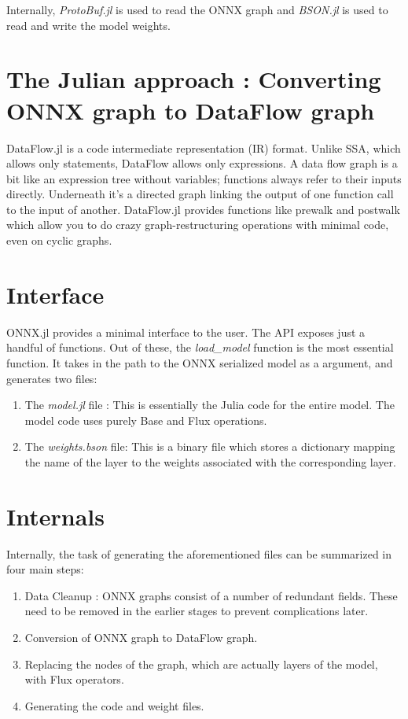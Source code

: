\documentclass{juliacon}
\begin{document}
Internally, \textit{ProtoBuf.jl} is used to read the ONNX graph and \textit{BSON.jl} is used to read and write the model weights.

\section{The Julian approach : Converting ONNX graph to DataFlow graph}

DataFlow.jl is a code intermediate representation (IR) format. Unlike SSA, which allows only statements, DataFlow allows only expressions. A data flow graph is a bit like an expression tree without variables; functions always refer to their inputs directly. Underneath it's a directed graph linking the output of one function call to the input of another. DataFlow.jl provides functions like prewalk and postwalk which allow you to do crazy graph-restructuring operations with minimal code, even on cyclic graphs. 

\section{Interface}
\label{sec:additional_doc}
%
ONNX.jl provides a minimal interface to the user. The API exposes just a handful of functions. Out of these, the \textit{load\_model} function is the most essential function. It takes in the path to the ONNX serialized model as a argument, and generates two files:
\begin{enumerate}
    \item The \textit{model.jl} file : This is essentially the Julia code for the entire model. The model code uses purely Base and Flux operations.
    \item The \textit{weights.bson} file: This is a binary file which stores a dictionary mapping the name of the layer to the weights associated with the corresponding layer.
\end{enumerate}

\section{Internals}

Internally, the task of generating the aforementioned files can be summarized in four main steps:

\begin{enumerate}
    \item Data Cleanup : ONNX graphs consist of a number of redundant fields. These need to be removed in the earlier stages to prevent complications later.
    \item Conversion of ONNX graph to DataFlow graph. 
    \item Replacing the nodes of the graph, which are actually layers of the model, with Flux operators.
    \item Generating the code and weight files.
\end{enumerate}
\end{document}

